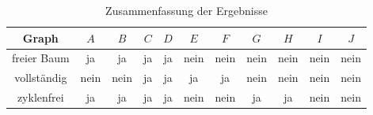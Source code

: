 \documentclass[11pt]{article}
\begin{document}
\begin{table}[h!]
  \centering
  \begin{tabular}{|c|c|c|c|c|c|c|c|c|c|c|}
    \hline
    Graph & $A$ & $B$ & $C$ & $D$ & $E$ & $F$ & $G$ & $H$ & $I$ & $J$ \\
    \hline
    freier Baum & ja & ja & ja & ja & nein & nein & nein & nein & nein & nein \\
    \hline
    vollständig & nein & nein & ja & ja & ja & ja & nein & nein & nein & nein \\
    \hline
    zyklenfrei & ja & ja & ja & ja & nein & nein & ja & ja & nein & nein \\
    \hline
  \end{tabular}
  \caption{Zusammenfassung der Ergebnisse}
  \label{tab:table_a2}
\end{table}
\end{document}

